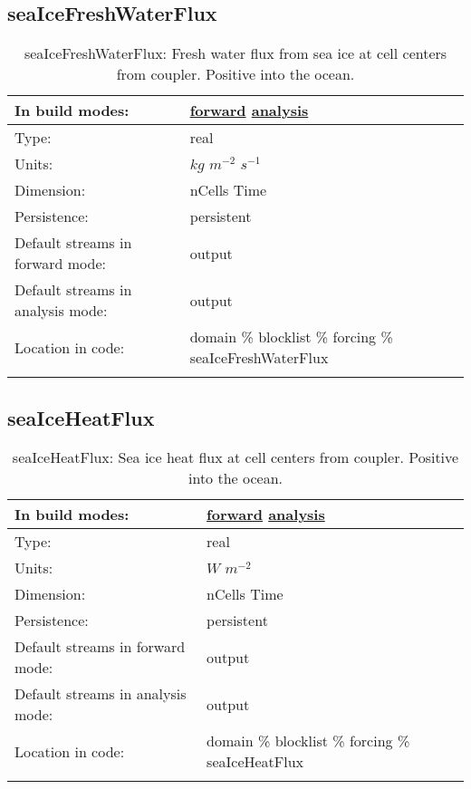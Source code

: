 \subsection[seaIceFreshWaterFlux]{seaIceFreshWaterFlux}
\label{subsec:var_sec_forcing_seaIceFreshWaterFlux}
\begin{center}
\begin{longtable}{| p{2.0in} | p{4.0in} |}
        \hline 
        In build modes: & \hyperref[subsec:forward_var_tab_forcing]{forward} \hyperref[subsec:analysis_var_tab_forcing]{analysis} \\
        \hline 
        Type: & real \\
        \hline 
        Units: & $kg$ $m^{-2}$ $s^{-1}$ \\
        \hline 
        Dimension: & nCells Time \\
        \hline 
        Persistence: & persistent \\
        \hline 
		 Default streams in forward mode: &  output \\
        \hline 
		 Default streams in analysis mode: &  output \\
        \hline 
		 Location in code: & domain \% blocklist \% forcing \% seaIceFreshWaterFlux \\
		 \hline 
    \caption{seaIceFreshWaterFlux: Fresh water flux from sea ice at cell centers from coupler. Positive into the ocean.}
\end{longtable}
\end{center}
\subsection[seaIceHeatFlux]{seaIceHeatFlux}
\label{subsec:var_sec_forcing_seaIceHeatFlux}
\begin{center}
\begin{longtable}{| p{2.0in} | p{4.0in} |}
        \hline 
        In build modes: & \hyperref[subsec:forward_var_tab_forcing]{forward} \hyperref[subsec:analysis_var_tab_forcing]{analysis} \\
        \hline 
        Type: & real \\
        \hline 
        Units: & $W$ $m^{-2}$ \\
        \hline 
        Dimension: & nCells Time \\
        \hline 
        Persistence: & persistent \\
        \hline 
		 Default streams in forward mode: &  output \\
        \hline 
		 Default streams in analysis mode: &  output \\
        \hline 
		 Location in code: & domain \% blocklist \% forcing \% seaIceHeatFlux \\
		 \hline 
    \caption{seaIceHeatFlux: Sea ice heat flux at cell centers from coupler. Positive into the ocean.}
\end{longtable}
\end{center}

